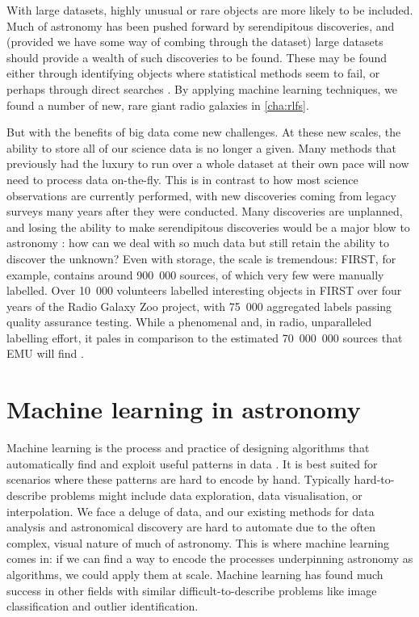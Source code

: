     With large datasets, highly unusual or rare objects are more likely to be included. Much of astronomy has been pushed forward by serendipitous discoveries, and (provided we have some way of combing through the dataset) large datasets should provide a wealth of such discoveries to be found. These may be found either through identifying objects where statistical methods seem to fail, or perhaps through direct searches \citep{norris17unexpected}. By applying machine learning techniques, we found a number of new, rare giant radio galaxies in \autoref{cha:rlfs}.

    But with the benefits of big data come new challenges. At these new scales, the ability to store all of our science data is no longer a given. Many methods that previously had the luxury to run over a whole dataset at their own pace will now need to process data on-the-fly. This is in contrast to how most science observations are currently performed, with new discoveries coming from legacy surveys many years after they were conducted. Many discoveries are unplanned, and losing the ability to make serendipitous discoveries would be a major blow to astronomy \citep{norris17unexpected}: how can we deal with so much data but still retain the ability to discover the unknown? Even with storage, the scale is tremendous: FIRST, for example, contains around 900~000 sources, of which very few were manually labelled. Over 10~000 volunteers labelled interesting objects in FIRST over four years of the Radio Galaxy Zoo project, with 75~000 aggregated labels passing quality assurance testing. While a phenomenal and, in radio, unparalleled labelling effort, it pales in comparison to the estimated 70~000~000 sources that EMU will find \citep{banfield15}.

\section{Machine learning in astronomy}
\label{sec:ml-in-astro}

    Machine learning is the process and practice of designing algorithms that automatically find and exploit useful patterns in data \citep{deisenroth_mathematics_2020}. It is best suited for scenarios where these patterns are hard to encode by hand. Typically hard-to-describe problems might include data exploration, data visualisation, or interpolation. We face a deluge of data, and our existing methods for data analysis and astronomical discovery are hard to automate due to the often complex, visual nature of much of astronomy. This is where machine learning comes in: if we can find a way to encode the processes underpinning astronomy as algorithms, we could apply them at scale. Machine learning has found much success in other fields with similar difficult-to-describe problems like image classification and outlier identification.

